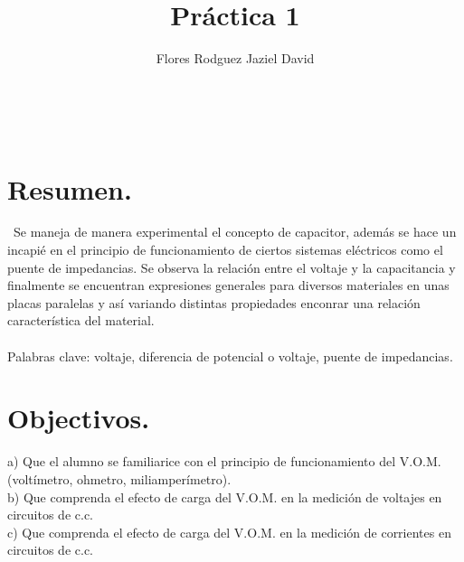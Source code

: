 \documentclass[11pt,a4paper]{article}
\author{Flores Rodguez Jaziel David }
\title{Práctica 1}
\begin{document}
\tableofcontents
\\
\medskip
\medskip
\section{Resumen.}
\
Se maneja de manera experimental el concepto de capacitor, adem\'{a}s se hace un incapi\'{e} en el principio de funcionamiento de ciertos sistemas el\'{e}ctricos como el puente de impedancias. Se observa la relaci\'{o}n entre el voltaje y la capacitancia y finalmente se encuentran expresiones generales para diversos materiales en unas placas paralelas y as\'{i} variando distintas propiedades enconrar una relaci\'{o}n caracter\'{i}stica del material.\\
\\
\medskip
Palabras clave: voltaje, diferencia de potencial o voltaje, puente de impedancias.


\section{Objectivos.}
a) Que el alumno se familiarice con el principio de funcionamiento del V.O.M. (volt\'{i}metro, ohmetro, miliamper\'{i}metro).\\ 

b) Que comprenda el efecto de carga del V.O.M. en la medici\'{o}n de voltajes en circuitos de c.c.\\

c) Que comprenda el efecto de carga del V.O.M. en la medici\'{o}n de corrientes en circuitos de c.c.\\
\pagebreak


\end{document}
